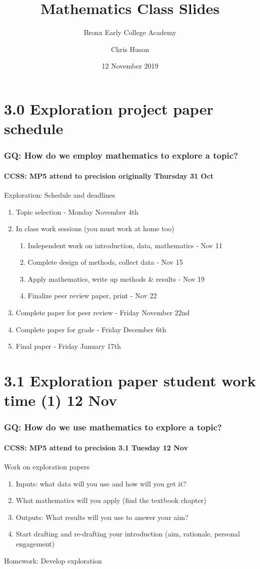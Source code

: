\documentclass{beamer}
\title{Mathematics Class Slides}
\subtitle{Bronx Early College Academy}
\author{Chris Huson}
\date{12 November 2019}
\begin{document}
\frame{\titlepage}
\section[Outline]{}
\frame{\tableofcontents}

\section{3.0 Exploration project paper schedule}
\frame
{
  \frametitle{GQ: How do we employ mathematics to explore a topic?}
  \framesubtitle{CCSS: MP5 attend to precision \hfill \alert{originally Thursday 31 Oct}}
  \begin{block}{Exploration: Schedule and deadlines}
    \begin{enumerate}
      \item Topic selection - Monday November 4th
      \item In class work sessions (you must work at home too)
      \begin{enumerate}
        \item Independent work on introduction, data, mathematics - Nov 11
        \item Complete design of methods, collect data - Nov 15
        \item Apply mathematics, write up methods \& results - Nov 19
        \item Finalize peer review paper, print - Nov 22
      \end{enumerate}
      \item Complete paper for peer review - Friday November 22nd
      \item Complete paper for grade - Friday December 6th
      \item Final paper - Friday January 17th
    \end{enumerate}
    \end{block}
}

\section{3.1 Exploration paper student work time (1) 12 Nov}
\frame
{
  \frametitle{GQ: How do we use mathematics to explore a topic?}
  \framesubtitle{CCSS: MP5 attend to precision \hfill \alert{3.1 Tuesday 12 Nov}}

  \begin{block}{Work on exploration papers}
  \begin{enumerate}
      \item Inputs: what data will you use and how will you get it? 
      \item What mathematics will you apply (find the textbook chapter)
      \item Outputs: What results will you use to answer your aim?
      \item Start drafting and re-drafting your introduction (aim, rationale, personal engagement)
  \end{enumerate}
  \end{block}
  Homework: Develop exploration 
}
\end{document}
